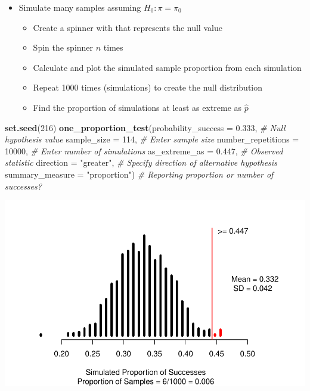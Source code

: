 \documentclass[
]{report}
\newenvironment{Shaded}{\begin{snugshade}}{\end{snugshade}}
\newcommand{\AttributeTok}[1]{\textcolor[rgb]{0.13,0.29,0.53}{#1}}
\newcommand{\CommentTok}[1]{\textcolor[rgb]{0.56,0.35,0.01}{\textit{#1}}}
\newcommand{\DecValTok}[1]{\textcolor[rgb]{0.00,0.00,0.81}{#1}}
\newcommand{\FloatTok}[1]{\textcolor[rgb]{0.00,0.00,0.81}{#1}}
\newcommand{\FunctionTok}[1]{\textcolor[rgb]{0.13,0.29,0.53}{\textbf{#1}}}
\newcommand{\NormalTok}[1]{#1}
\newcommand{\StringTok}[1]{\textcolor[rgb]{0.31,0.60,0.02}{#1}}
\begin{document}
\begin{itemize}
\item
  Simulate many samples assuming \(H_0: \pi = \pi_0\)

  \begin{itemize}
  \item
    Create a spinner with that represents the null value
  \item
    Spin the spinner \(n\) times
  \item
    Calculate and plot the simulated sample proportion from each simulation
  \item
    Repeat 1000 times (simulations) to create the null distribution
  \item
    Find the proportion of simulations at least as extreme as \(\hat{p}\)
  \end{itemize}
\end{itemize}

\begin{Shaded}
\begin{Highlighting}[]
\FunctionTok{set.seed}\NormalTok{(}\DecValTok{216}\NormalTok{)}
\FunctionTok{one\_proportion\_test}\NormalTok{(}\AttributeTok{probability\_success =} \FloatTok{0.333}\NormalTok{, }\CommentTok{\# Null hypothesis value}
          \AttributeTok{sample\_size =} \DecValTok{114}\NormalTok{, }\CommentTok{\# Enter sample size}
          \AttributeTok{number\_repetitions =} \DecValTok{10000}\NormalTok{, }\CommentTok{\# Enter number of simulations}
          \AttributeTok{as\_extreme\_as =} \FloatTok{0.447}\NormalTok{, }\CommentTok{\# Observed statistic}
          \AttributeTok{direction =} \StringTok{"greater"}\NormalTok{, }\CommentTok{\# Specify direction of alternative hypothesis}
          \AttributeTok{summary\_measure =} \StringTok{"proportion"}\NormalTok{) }\CommentTok{\# Reporting proportion or number of successes?}
\end{Highlighting}
\end{Shaded}

\begin{center}\includegraphics[width=0.7\linewidth]{03-VN03-EDA_OneCatSimulation_files/figure-latex/unnamed-chunk-8-1} \end{center}
\end{document}
